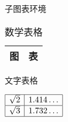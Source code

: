 \begin{table}
  \caption{子图表环境}
  \begin{subtable}[b]{.5\textwidth}
    \centering
    \begin{tabular}{|c|c|} \hline 图 & 表 \\ \hline \end{tabular}
    \caption{文字表格}
  \end{subtable}%
  \begin{subtable}[b]{.5\textwidth}
    \centering
    $\begin{array}{|c|c|}
      \hline \sqrt{2} & 1.414\dots \\ \hline
      \sqrt{3} & 1.732\dots \\ \hline
    \end{array}$
    \caption{数学表格}
  \end{subtable}
\end{table}
